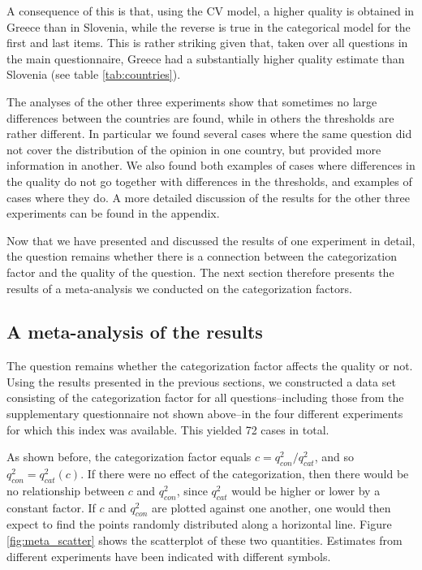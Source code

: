 \documentclass[a4paper,12pt]{article}
\begin{document}
A consequence of this is that, using the CV model, a higher quality is obtained in Greece than in Slovenia, while the reverse is true in the categorical model for the first and last items. This is rather striking given that, taken over all questions in the main questionnaire, Greece had a substantially higher quality estimate than Slovenia (see table \ref{tab:countries}).

The analyses of the other three experiments show that sometimes no large differences between the countries are found, while in others the thresholds are rather different. In particular we found several cases where the same question did not cover the distribution of the opinion in one country, but provided more information in another. We also found both examples of cases where differences in the quality do not go together with differences in the thresholds, and examples of cases where they do. A more detailed discussion of the results for the other three experiments can be found in the appendix.

Now that we have presented and discussed the results of one experiment in detail, the question remains whether there is a connection between the categorization factor and the quality of the question. The next section therefore presents the results of a meta-analysis we conducted on the categorization factors. 


\subsection{A meta-analysis of the results}

The question remains whether the categorization factor affects the quality or not.
Using the results presented in the previous sections, we constructed a data set consisting of the categorization factor for all questions--including those from the supplementary questionnaire not shown above--in the four different experiments for which this index was available. This yielded 72 cases in total. 

As shown before, the categorization factor equals $c = q^2_{con} / q^2_{cat}$, and so $q^2_{con} = q^2_{cat} (c)$. If there were no effect of the categorization, then there would be no relationship between $c$ and $q^2_{con}$, since $q^2_{cat}$ would be higher or lower by a constant factor. If  $c$ and $q^2_{con}$ are plotted against one another, one would then expect to find the points randomly distributed along a horizontal line. Figure \ref{fig:meta_scatter} shows the scatterplot of these two quantities. Estimates from different experiments have been indicated with different symbols.
\end{document}
